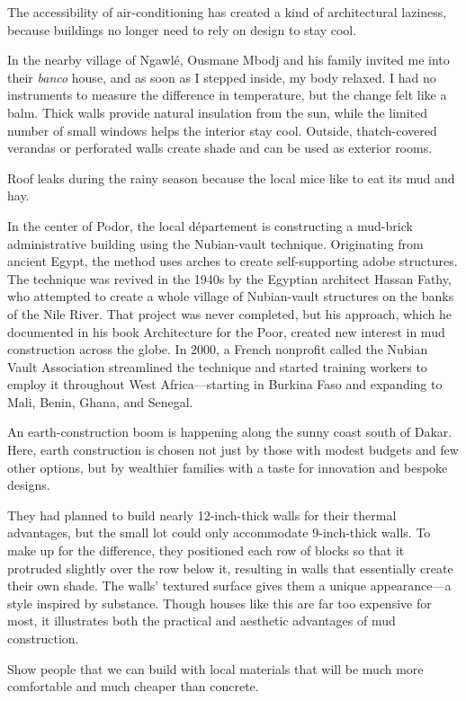 \documentclass[
]{book}
\begin{document}
The accessibility of air-conditioning has created a kind of architectural laziness, because buildings no longer need to rely on design to stay cool.

In the nearby village of Ngawlé, Ousmane Mbodj and his family invited me into their \emph{banco} house, and as soon as I stepped inside, my body relaxed. I had no instruments to measure the difference in temperature, but the change felt like a balm.
Thick walls provide natural insulation from the sun, while the limited number of small windows helps the interior stay cool. Outside, thatch-covered verandas or perforated walls create shade and can be used as exterior rooms.

Roof leaks during the rainy season because the local mice like to eat its mud and hay.

In the center of Podor, the local département is constructing a mud-brick administrative building using the Nubian-vault technique. Originating from ancient Egypt, the method uses arches to create self-supporting adobe structures. The technique was revived in the 1940s by the Egyptian architect Hassan Fathy, who attempted to create a whole village of Nubian-vault structures on the banks of the Nile River. That project was never completed, but his approach, which he documented in his book Architecture for the Poor, created new interest in mud construction across the globe. In 2000, a French nonprofit called the Nubian Vault Association streamlined the technique and started training workers to employ it throughout West Africa---starting in Burkina Faso and expanding to Mali, Benin, Ghana, and Senegal.

An earth-construction boom is happening along the sunny coast south of Dakar. Here, earth construction is chosen not just by those with modest budgets and few other options, but by wealthier families with a taste for innovation and bespoke designs.

They had planned to build nearly 12-inch-thick walls for their thermal advantages, but the small lot could only accommodate 9-inch-thick walls. To make up for the difference, they positioned each row of blocks so that it protruded slightly over the row below it, resulting in walls that essentially create their own shade. The walls' textured surface gives them a unique appearance---a style inspired by substance. Though houses like this are far too expensive for most, it illustrates both the practical and aesthetic advantages of mud construction.

Show people that we can build with local materials that will be much more comfortable and much cheaper than concrete.
\end{document}
